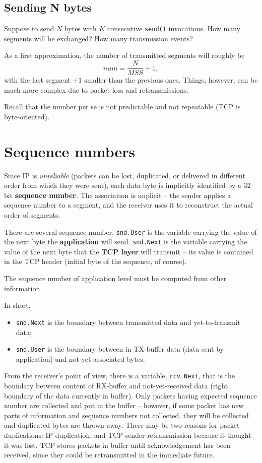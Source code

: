 \documentclass[a4paper, 12pt]{report}
\begin{document}
\subsection{Sending N bytes}

Suppose to send $N$ bytes with $K$ consecutive \texttt{send()} invocations. How
many segments will be exchanged? How many transmission events?

As a first approximation, the number of transmitted segments will roughly be
$$num = \frac{N}{MSS} + 1,$$ with the last segment $+1$ smaller than the
previous ones. Things, however, can be much more complex due to packet loss and
retransmissions.

Recall that the number per se is not predictable and not repeatable (TCP is
byte-oriented).

\section{Sequence numbers}

Since IP is \emph{unreliable} (packets can be lost, duplicated, or delivered in
different order from which they were sent), each data byte is implicitly
identified by a $32$ bit \textbf{sequence number}. The association is implicit
\--- the sender applies a sequence number to a segment, and the receiver uses
it to reconstruct the actual order of segments.

There are several sequence number. \texttt{snd.User} is the variable carrying
the value of the next byte the \textbf{application} will send.
\texttt{snd.Next} is the variable carrying the value of the next byte that the
\textbf{TCP layer} will transmit \--- its value is contained in the TCP header
(initial byte of the sequence, of course).

The sequence number of application level must be computed from other
information.

In short,

\begin{itemize}
	\item \texttt{snd.Next} is the boundary between transmitted data and
		yet-to-transmit data;
	\item \texttt{snd.User} is the boundary between in TX-buffer data (data
		sent by application) and not-yet-associated bytes.
\end{itemize}

From the receiver's point of view, there is a variable, \texttt{rcv.Next}, that
is the boundary between content of RX-buffer and not-yet-received data (right
boundary of the data currently in buffer). Only packets having expected
sequence number are collected and put in the buffer \--- however, if some
packet has new parts of information and sequence numbers not collected, they
will be collected and duplicated bytes are thrown away. There may be two
reasons for packet duplications: IP duplication, and TCP sender retransmission
because it thought it was lost. TCP stores packets in buffer until
acknowledgement has been received, since they could be retransmitted in the
immediate future.
\end{document}
